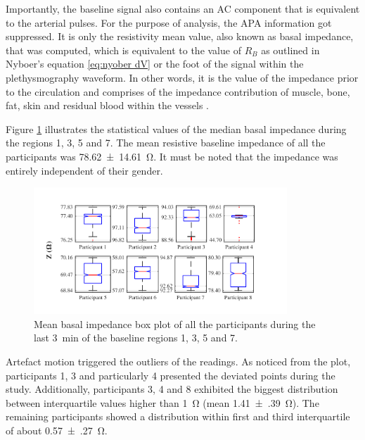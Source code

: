 Importantly, the baseline signal also contains an AC component that is equivalent to the arterial pulses. For the purpose of analysis, the APA information got suppressed. It is only the resistivity mean value, also known as basal impedance, that was computed, which is equivalent to the value of $R_B$ as outlined in Nyboer's equation \ref{eq:nyober dV} or the foot of the signal within the plethysmography waveform. In other words, it is the value of the impedance prior to the circulation and comprises of the impedance contribution of muscle, bone, fat, skin and residual blood within the vessels \cite{dai2009vivo}. 

Figure \ref{fig:Basal statistics} illustrates the statistical values of the median basal impedance during the regions 1, 3, 5 and 7. The mean resistive baseline impedance of all the participants was \SI{78.62(1461)}{\ohm}. It must be noted that the impedance was entirely independent of their gender.  

\begin{figure}[!htbp]
	\centering
	\includegraphics[width=0.85\textwidth,keepaspectratio]{figure_b_1}    
	\caption[Mean basal impedance box plot]{Mean basal impedance box plot of all the participants during the last \SI{3}{\minute} of the baseline regions 1, 3, 5 and 7.}
	\label{fig:Basal statistics} 
\end{figure}

Artefact motion triggered the outliers of the readings. As noticed from the plot, participants 1, 3 and particularly 4 presented the deviated points during the study. Additionally, participants 3, 4 and 8 exhibited the biggest distribution between interquartile values higher than \SI{1}{\ohm} (mean \SI{1.41(39)}{\ohm}). The remaining participants showed a distribution within first and third interquartile of about \SI{0.57(27)}{\ohm}. 

